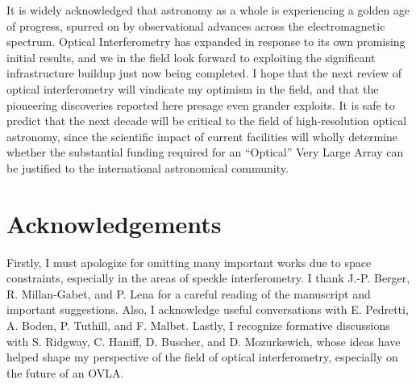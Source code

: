 \documentclass[12pt]{article}
\begin{document}
It is widely acknowledged that astronomy as a whole is experiencing a
golden age of progress, spurred on by observational advances across
the electromagnetic spectrum.  Optical Interferometry has expanded in
response to its own promising initial results, and we in the field
look forward to exploiting the significant infrastructure buildup just
now being completed.  I hope that the next review of optical
interferometry will vindicate my optimism in the field, and that the
pioneering discoveries reported here presage even grander exploits.
It is safe to predict that 
the next decade will be critical to the field of high-resolution
optical astronomy, since the scientific impact of current facilities
will wholly determine whether the substantial funding required for an
``Optical'' Very Large Array can be justified to the international
astronomical community.  

\section*{Acknowledgements}

Firstly, I must apologize for omitting many important works due to
space constraints, especially in the areas of speckle interferometry.
I thank J.-P. Berger, R. Millan-Gabet, and P. Lena for a careful
reading of the manuscript and important suggestions. Also, I
acknowledge useful conversations with E. Pedretti, A. Boden, 
P. Tuthill, and F.  Malbet.  
Lastly, I recognize formative discussions with S. Ridgway, C.
Haniff, D.  Buscher, and D.  Mozurkewich, whose ideas have helped
shape my perspective of the field of optical interferometry,
especially on the future of an OVLA.

\footnotesize


\end{document}
